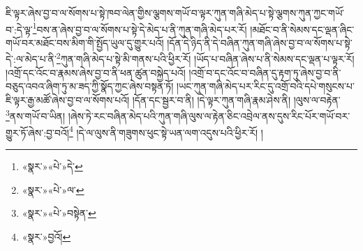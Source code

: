 ཇི་ལྟར་ཞེས་བྱ་བ་ལ་སོགས་པ་སྟེ་ཁབ་ལེན་གྱིས་ལྕགས་གཡོ་བ་ལྟར་ཀུན་གཞི་མེད་པ་སྟེ་ལྕགས་ཀུན་ཀྱང་གཡོ་བ་:དེ་ལྟ་\footnote{«སྣར་»«པེ་»དེ་}བས་ན་ཞེས་བྱ་བ་ལ་སོགས་པ་སྟེ་དེ་མེད་པ་ནི་ཀུན་གཞི་མེད་པར་རོ། །མཐོང་བ་ནི་སེམས་དང་ལྡན་ཞིང་གཡོ་བར་མཐོང་བས་མིག་གི་སྤྱོད་ཡུལ་དུ་གྱུར་པའོ། །དོན་དེ་ཉིད་ནི་དེ་བཞིན་ཀུན་གཞི་ཞེས་བྱ་བ་ལ་སོགས་པ་སྟེ་དེ་:ལ་མེད་པ་ནི་\footnote{«སྣར་»«པེ་»ལ་}ཀུན་གཞི་མེད་པ་སྟེ་མི་གནས་པའི་ཕྱིར་རོ། །ཡོད་པ་བཞིན་ཞེས་པ་ནི་སེམས་དང་ལྡན་པ་ལྟར་རོ། །འགྲོ་དང་འོང་བ་རྣམས་ཞེས་བྱ་བ་ནི་ཕན་ཚུན་བསྐྱེད་པའོ། །འགྲོ་བ་དང་འོང་བ་བཞིན་དུ་རྟག་ཏུ་ཞེས་བྱ་བ་ནི་བཅུད་འབའ་ཞིག་ཏུ་མ་ཟད་ཀྱི་སྣོད་ཀྱང་ཞེས་བསྟན་ཏོ། །ཡང་ཀུན་གཞི་མེད་པར་རིང་དུ་འགྲོ་བའི་དཔེ་གསུངས་པ་ཇི་ལྟར་རྒྱ་མཚོ་ཞེས་བྱ་བ་ལ་སོགས་པའོ། །དོན་དང་སྦྱར་བ་ནི། །དེ་ལྟར་ཀུན་གཞི་རྣམ་ཤེས་ནི། །ལུས་ལ་བརྟེན་\footnote{«སྣར་»«པེ་»བསྟེན་}ནས་གཡོ་བ་ཡིན། །ཞེས་ཏེ་རང་བཞིན་མེད་པའི་ཀུན་གཞི་ལུས་ལ་རྟེན་ཅིང་འབྲེལ་ནས་དུས་རིང་པོར་གཡོ་བར་གྱུར་ཏོ་ཞེས་:བྱ་བའོ།\footnote{«སྣར་»བྱའོ།} །དེ་ལ་ལུས་ནི་གཟུགས་ཕུང་སྟེ་ཡན་ལག་འདུས་པའི་ཕྱིར་རོ། །
